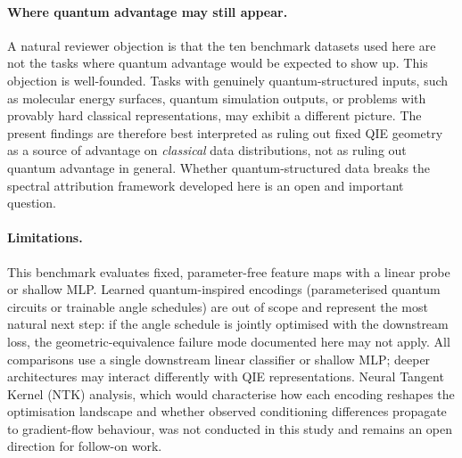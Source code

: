 \paragraph{Where quantum advantage may still appear.}
A natural reviewer objection is that the ten benchmark datasets used here
are not the tasks where quantum advantage would be expected to show up.
This objection is well-founded.
Tasks with genuinely quantum-structured inputs, such as molecular energy
surfaces, quantum simulation outputs, or problems with provably hard classical
representations, may exhibit a different picture.
The present findings are therefore best interpreted as ruling out fixed QIE
geometry as a source of advantage on \emph{classical} data distributions, not
as ruling out quantum advantage in general.
Whether quantum-structured data breaks the spectral attribution framework
developed here is an open and important question.

\paragraph{Limitations.}
This benchmark evaluates fixed, parameter-free feature maps with a linear
probe or shallow MLP.
Learned quantum-inspired encodings (parameterised quantum circuits or trainable
angle schedules) are out of scope and represent the most natural next step:
if the angle schedule is jointly optimised with the downstream loss, the
geometric-equivalence failure mode documented here may not apply.
All comparisons use a single downstream linear classifier or shallow MLP;
deeper architectures may interact differently with QIE representations.
Neural Tangent Kernel (NTK) analysis, which would characterise how each
encoding reshapes the optimisation landscape and whether observed conditioning
differences propagate to gradient-flow behaviour, was not conducted in this
study and remains an open direction for follow-on work.
